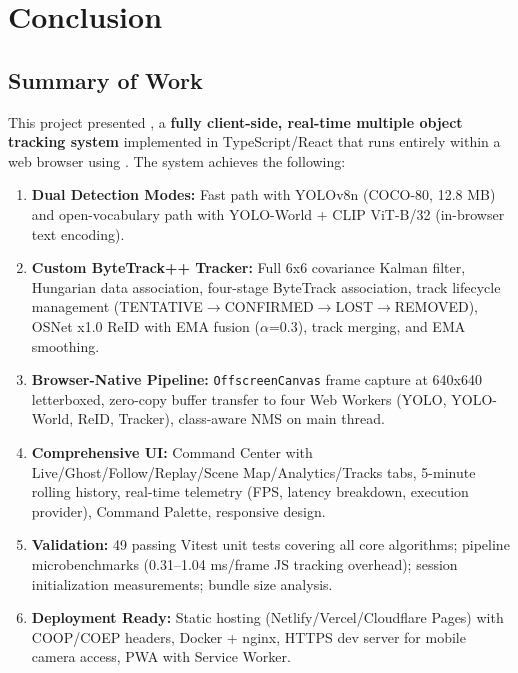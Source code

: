 \chapter{Conclusion}
\label{ch:conclusion}

\section{Summary of Work}
\label{sec:summary}

This project presented \trackvision, a \textbf{fully client-side, real-time multiple object tracking system} implemented in TypeScript/React that runs entirely within a web browser using \onnxweb. The system achieves the following:

\begin{enumerate}
    \item \textbf{Dual Detection Modes:} Fast path with YOLOv8n (COCO-80, 12.8 MB) and open-vocabulary path with YOLO-World + CLIP ViT-B/32 (in-browser text encoding).
    \item \textbf{Custom ByteTrack++ Tracker:} Full 6x6 covariance Kalman filter, Hungarian data association, four-stage ByteTrack association, track lifecycle management (TENTATIVE$\to$CONFIRMED$\to$LOST$\to$REMOVED), OSNet x1.0 ReID with EMA fusion ($\alpha$=0.3), track merging, and EMA smoothing.
    \item \textbf{Browser-Native Pipeline:} \texttt{OffscreenCanvas} frame capture at 640x640 letterboxed, zero-copy buffer transfer to four Web Workers (YOLO, YOLO-World, ReID, Tracker), class-aware NMS on main thread.
    \item \textbf{Comprehensive UI:} Command Center with Live/Ghost/Follow/Replay/Scene Map/Analytics/Tracks tabs, 5-minute rolling history, real-time telemetry (FPS, latency breakdown, execution provider), Command Palette, responsive design.
    \item \textbf{Validation:} 49 passing Vitest unit tests covering all core algorithms; pipeline microbenchmarks (0.31--1.04 ms/frame JS tracking overhead); session initialization measurements; bundle size analysis.
    \item \textbf{Deployment Ready:} Static hosting (Netlify/Vercel/Cloudflare Pages) with COOP/COEP headers, Docker + nginx, HTTPS dev server for mobile camera access, PWA with Service Worker.
\end{enumerate}

